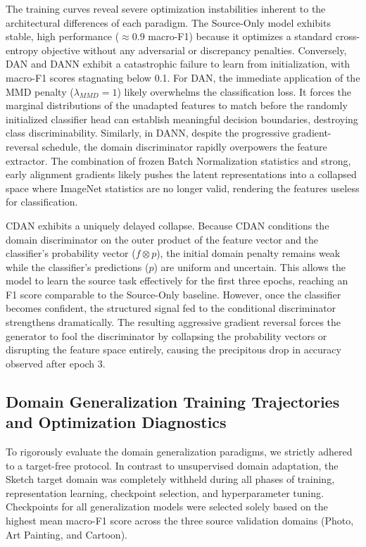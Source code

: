 \documentclass{article}
\begin{document}
The training curves reveal severe optimization instabilities inherent to the architectural differences of each paradigm. The Source-Only model exhibits stable, high performance ($\approx0.9$ macro-F1) because it optimizes a standard cross-entropy objective without any adversarial or discrepancy penalties. Conversely, DAN and DANN exhibit a catastrophic failure to learn from initialization, with macro-F1 scores stagnating below 0.1. For DAN, the immediate application of the MMD penalty ($\lambda_{MMD}=1$) likely overwhelms the classification loss. It forces the marginal distributions of the unadapted features to match before the randomly initialized classifier head can establish meaningful decision boundaries, destroying class discriminability. Similarly, in DANN, despite the progressive gradient-reversal schedule, the domain discriminator rapidly overpowers the feature extractor. The combination of frozen Batch Normalization statistics and strong, early alignment gradients likely pushes the latent representations into a collapsed space where ImageNet statistics are no longer valid, rendering the features useless for classification.

CDAN exhibits a uniquely delayed collapse. Because CDAN conditions the domain discriminator on the outer product of the feature vector and the classifier's probability vector ($f \otimes p$), the initial domain penalty remains weak while the classifier's predictions ($p$) are uniform and uncertain. This allows the model to learn the source task effectively for the first three epochs, reaching an F1 score comparable to the Source-Only baseline. However, once the classifier becomes confident, the structured signal fed to the conditional discriminator strengthens dramatically. The resulting aggressive gradient reversal forces the generator to fool the discriminator by collapsing the probability vectors or disrupting the feature space entirely, causing the precipitous drop in accuracy observed after epoch 3.

\subsection{Domain Generalization Training Trajectories and Optimization Diagnostics}
\label{appendix:task3_training}

To rigorously evaluate the domain generalization paradigms, we strictly adhered to a target-free protocol. In contrast to unsupervised domain adaptation, the Sketch target domain was completely withheld during all phases of training, representation learning, checkpoint selection, and hyperparameter tuning. Checkpoints for all generalization models were selected solely based on the highest mean macro-F1 score across the three source validation domains (Photo, Art Painting, and Cartoon).
\end{document}
